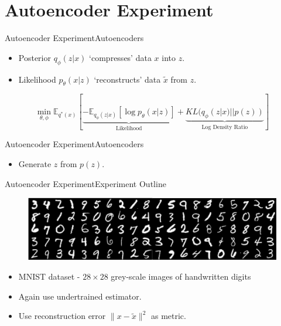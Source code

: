 \documentclass[handout]{beamer}
\newcommand{\E}{\mathbb{E}}
\begin{document}
\section{Autoencoder Experiment}
\begin{frame}{Autoencoder Experiment}{Autoencoders}
\begin{itemize}
\item Posterior $q_\phi(z|x)$ `compresses' data $x$ into $z$.
\item Likelihood $p_\theta(x|z)$ `reconstructs' data $\tilde{x}$ from $z$.
\end{itemize}
\begin{figure}[h]
  \centering
\end{figure}
\[\min_{\theta, \phi} \E_{q^*(x)}[\underbrace{-\mathbb{E}_{q_\phi(z|x)}[\log p_\theta(x|z)]}_{\text{Likelihood}}+\underbrace{KL(q_\phi(z|x)||p(z))}_{\text{Log Density Ratio}}]\]
\end{frame}
\begin{frame}{Autoencoder Experiment}{Autoencoders}
\begin{itemize}
\item Generate $z$ from $p(z)$.
\end{itemize}
\begin{figure}[h]
  \centering
\end{figure}
\end{frame}
\begin{frame}{Autoencoder Experiment}{Experiment Outline}
\begin{figure}
\includegraphics[width=\linewidth]{mnist-digits-small.png}
\end{figure}
\begin{itemize}
\item MNIST dataset - $28\times 28$ grey-scale images of handwritten digits
\vspace{0.3cm}
\item Again use undertrained estimator.
\vspace{0.3cm}
\item Use reconstruction error $\|x-\tilde{x}\|^2$ as metric.
\end{itemize}
\end{frame}
\end{document}
